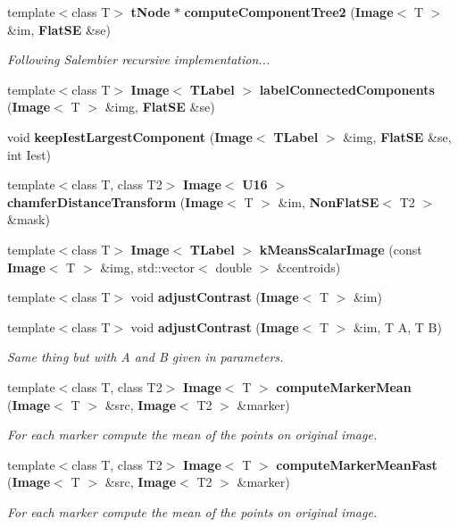 \begin{CompactItemize}
template$<$class T$>$ {\bf t\-Node} $\ast$ {\bf compute\-Component\-Tree2} ({\bf Image}$<$ T $>$ \&im, {\bf Flat\-SE} \&se)
\begin{CompactList}\small\item\em Following Salembier recursive implementation... \item\end{CompactList}\item 
template$<$class T$>$ {\bf Image}$<$ {\bf TLabel} $>$ {\bf label\-Connected\-Components} ({\bf Image}$<$ T $>$ \&img, {\bf Flat\-SE} \&se)
\item 
void {\bf keep\-Iest\-Largest\-Component} ({\bf Image}$<$ {\bf TLabel} $>$ \&img, {\bf Flat\-SE} \&se, int Iest)
\item 
template$<$class T, class T2$>$ {\bf Image}$<$ {\bf U16} $>$ {\bf chamfer\-Distance\-Transform} ({\bf Image}$<$ T $>$ \&im, {\bf Non\-Flat\-SE}$<$ T2 $>$ \&mask)
\item 
template$<$class T$>$ {\bf Image}$<$ {\bf TLabel} $>$ {\bf k\-Means\-Scalar\-Image} (const {\bf Image}$<$ T $>$ \&img, std::vector$<$ double $>$ \&centroids)
\item 
template$<$class T$>$ void {\bf adjust\-Contrast} ({\bf Image}$<$ T $>$ \&im)
\item 
template$<$class T$>$ void {\bf adjust\-Contrast} ({\bf Image}$<$ T $>$ \&im, T A, T B)
\begin{CompactList}\small\item\em Same thing but with A and B given in parameters. \item\end{CompactList}\item 
template$<$class T, class T2$>$ {\bf Image}$<$ T $>$ {\bf compute\-Marker\-Mean} ({\bf Image}$<$ T $>$ \&src, {\bf Image}$<$ T2 $>$ \&marker)
\begin{CompactList}\small\item\em For each marker compute the mean of the points on original image. \item\end{CompactList}\item 
template$<$class T, class T2$>$ {\bf Image}$<$ T $>$ {\bf compute\-Marker\-Mean\-Fast} ({\bf Image}$<$ T $>$ \&src, {\bf Image}$<$ T2 $>$ \&marker)
\begin{CompactList}\small\item\em For each marker compute the mean of the points on original image. \item\end{CompactList}\item 

\end{CompactItemize}
